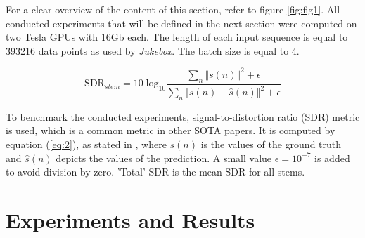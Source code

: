 \documentclass{llncs}
\begin{document}
For a clear overview of the content of this section, refer to figure \ref{fig:fig1}. All conducted experiments that will be defined in the next section were computed on  two Tesla GPUs with 16Gb each. The length of each input sequence is equal to 393216 data points as used by \textit{Jukebox}. The batch size is equal to 4.

\begin{equation}
\label{eq:2}
\text{SDR}_{stem} = 10\;\text{log}_{10} \frac{\sum_n \Vert s(n)\Vert^2+\epsilon}{\sum_n \Vert s(n) - \hat{s}(n) \Vert^2+\epsilon}
\end{equation}








To benchmark the conducted experiments, signal-to-distortion ratio (SDR) metric is used, which is a common metric in other SOTA papers\cite{DBLP:journals/corr/abs-1909-01174}\cite{Stoeter2019}\cite{Hennequin2020}\cite{sawata2021all}\cite{stoller2018waveunet}. 
It is computed by equation (\ref{eq:2}), as stated in \cite{musicDemixing}, where $s(n)$ is the values of the ground truth and $\hat{s}(n)$ depicts the values of the prediction. A small value $\epsilon=10^{-7}$ is added to avoid division by zero. 'Total' SDR is the mean SDR for all stems.


\section{Experiments and Results}

\begin{table}[htb]
\centering
{}
\caption{Comparison of SDR values per stem and in total for three different versions of our approach.}
\label{tab:sdr_tab_our_approach}
\end{table}
\end{document}
